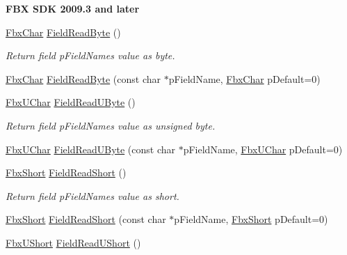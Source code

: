 \begin{Indent}\textbf{ F\+BX S\+DK 2009.3 and later}\par
\begin{DoxyCompactItemize}
\item 
\hyperlink{fbxtypes_8h_a34067dfe395a7cf3040b7b263c9024d2}{Fbx\+Char} \hyperlink{class_fbx_i_o_abd7cb1faa265a6c4e9438a99fd44aa8b}{Field\+Read\+Byte} ()
\begin{DoxyCompactList}\small\item\em Return field p\+Field\+Name\textquotesingle{}s value as byte. \end{DoxyCompactList}\item 
\hyperlink{fbxtypes_8h_a34067dfe395a7cf3040b7b263c9024d2}{Fbx\+Char} \hyperlink{class_fbx_i_o_af225dfcf4a2eafdbf9053a96cd0bc360}{Field\+Read\+Byte} (const char $\ast$p\+Field\+Name, \hyperlink{fbxtypes_8h_a34067dfe395a7cf3040b7b263c9024d2}{Fbx\+Char} p\+Default=0)
\item 
\hyperlink{fbxtypes_8h_a1be3cadf61e76f49142eb83e66ffe8bd}{Fbx\+U\+Char} \hyperlink{class_fbx_i_o_aad3f43e21757a60def0213926a611874}{Field\+Read\+U\+Byte} ()
\begin{DoxyCompactList}\small\item\em Return field p\+Field\+Name\textquotesingle{}s value as unsigned byte. \end{DoxyCompactList}\item 
\hyperlink{fbxtypes_8h_a1be3cadf61e76f49142eb83e66ffe8bd}{Fbx\+U\+Char} \hyperlink{class_fbx_i_o_a457b6931e3c7ed96a37813ab8d9d9b35}{Field\+Read\+U\+Byte} (const char $\ast$p\+Field\+Name, \hyperlink{fbxtypes_8h_a1be3cadf61e76f49142eb83e66ffe8bd}{Fbx\+U\+Char} p\+Default=0)
\item 
\hyperlink{fbxtypes_8h_a56e7a4f56baf132527df7c3cd07017b7}{Fbx\+Short} \hyperlink{class_fbx_i_o_a5d2e7076e0881341978f412613e57a9e}{Field\+Read\+Short} ()
\begin{DoxyCompactList}\small\item\em Return field p\+Field\+Name\textquotesingle{}s value as short. \end{DoxyCompactList}\item 
\hyperlink{fbxtypes_8h_a56e7a4f56baf132527df7c3cd07017b7}{Fbx\+Short} \hyperlink{class_fbx_i_o_a00d2ae43978eb21adc18e1d9f6341db1}{Field\+Read\+Short} (const char $\ast$p\+Field\+Name, \hyperlink{fbxtypes_8h_a56e7a4f56baf132527df7c3cd07017b7}{Fbx\+Short} p\+Default=0)
\item 
\hyperlink{fbxtypes_8h_a321ef060885fc068fd77ac69a49f51d9}{Fbx\+U\+Short} \hyperlink{class_fbx_i_o_a660e2929fc00fa522be7f6c695df2337}{Field\+Read\+U\+Short} ()

\end{DoxyCompactItemize}
\end{Indent}
